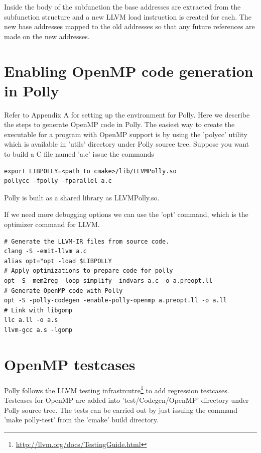 Inside the body of the subfunction the base addresses are extracted from the subfunction structure and a new LLVM load instruction is created for each. The
new base addresses mapped to the old addresses so that any future references are made on the new addresses.

\section{Enabling OpenMP code generation in Polly}
Refer to Appendix A for setting up the environment for Polly. Here we describe the steps
to generate OpenMP code in Polly. The easiest way to create the executable
for a program with OpenMP support is by using the 'polycc' utility
which is available in 'utils' directory under Polly source tree. Suppose you want to build a C file
named 'a.c' issue the commands
\begin{lstlisting}
export LIBPOLLY=<path to cmake>/lib/LLVMPolly.so
pollycc -fpolly -fparallel a.c
\end{lstlisting}
Polly is built as a shared library as LLVMPolly.so.

If we need more debugging options we can use the 'opt' command, which is the optimizer command for LLVM.

\begin{lstlisting}
# Generate the LLVM-IR files from source code.
clang -S -emit-llvm a.c
alias opt="opt -load $LIBPOLLY
# Apply optimizations to prepare code for polly
opt -S -mem2reg -loop-simplify -indvars a.c -o a.preopt.ll
# Generate OpenMP code with Polly
opt -S -polly-codegen -enable-polly-openmp a.preopt.ll -o a.ll
# Link with libgomp
llc a.ll -o a.s
llvm-gcc a.s -lgomp
\end{lstlisting}

\section{OpenMP testcases}

Polly follows the LLVM testing infrastrcutre\footnote{\url{http://llvm.org/docs/TestingGuide.html}} to add regression testcases. Testcases for OpenMP are added into
'test/Codegen/OpenMP' directory under Polly source tree. The tests can be carried out by just issuing the command 'make polly-test'
from the 'cmake' build directory.


